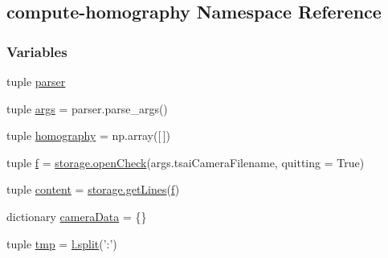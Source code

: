 \hypertarget{namespacecompute-homography}{\subsection{compute-\/homography Namespace Reference}
\label{namespacecompute-homography}
}
\subsubsection*{Variables}
\begin{DoxyCompactItemize}
\item 
tuple \hyperlink{namespacecompute-homography_a624c695f9972c02993d1c370c28867f8}{parser}
\item 
tuple \hyperlink{namespacecompute-homography_aab37023421b1c3ecc8a7648f41778972}{args} = parser.\-parse\-\_\-args()
\item 
tuple \hyperlink{namespacecompute-homography_a0feea80379e0368958412d7e9b529bd9}{homography} = np.\-array(\mbox{[}$\,$\mbox{]})
\item 
tuple \hyperlink{namespacecompute-homography_ad6d246e2e66e397bccbe023b703d1c76}{f} = \hyperlink{namespacestorage_ad83a9b3ef476a0684e7cc4875a77f040}{storage.\-open\-Check}(args.\-tsai\-Camera\-Filename, quitting = True)
\item 
tuple \hyperlink{namespacecompute-homography_a19f8208eea1885f83547ab59dfb6b1c1}{content} = \hyperlink{namespacestorage_ae247cceb087024add485a77083a1a56e}{storage.\-get\-Lines}(\hyperlink{namespacecompute-homography_ad6d246e2e66e397bccbe023b703d1c76}{f})
\item 
dictionary \hyperlink{namespacecompute-homography_a2be768add5fef829cc17c08693bba49b}{camera\-Data} = \{\}
\item 
tuple \hyperlink{namespacecompute-homography_af392738f6b769ed0f693dffef4f8bc65}{tmp} = \hyperlink{utils_8hpp_a59bef446cafa212bf03dca6fb59c207d}{l.\-split}('\-:')
\item 

\end{DoxyCompactItemize}
